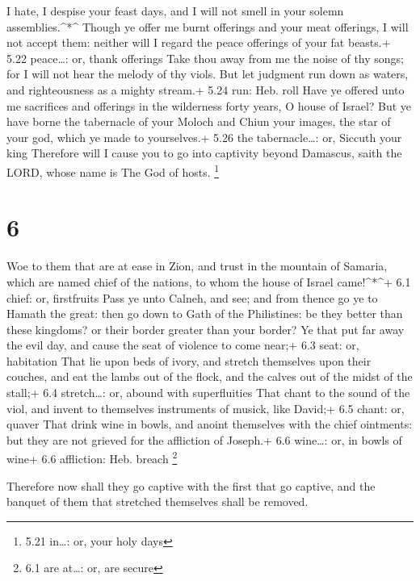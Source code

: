  I hate, I despise your feast days, and I will not smell in
your solemn assemblies.\^{}*\^{}  Though ye offer me burnt
offerings and your meat offerings, I will not accept them: neither will
I regard the peace offerings of your fat beasts.+ 5.22 peace\ldots: or,
thank offerings  Take thou away from me the noise of thy
songs; for I will not hear the melody of thy viols.  But
let judgment run down as waters, and righteousness as a mighty stream.+
5.24 run: Heb. roll  Have ye offered unto me sacrifices and
offerings in the wilderness forty years, O house of Israel?
 But ye have borne the tabernacle of your Moloch and Chiun
your images, the star of your god, which ye made to yourselves.+ 5.26
the tabernacle\ldots: or, Siccuth your king  Therefore will
I cause you to go into captivity beyond Damascus, saith the LORD, whose
name is The God of hosts. \footnote{5.21 in\ldots: or, your holy days}

\hypertarget{section-5}{%
\section{6}\label{section-5}}

 Woe to them that are at ease in Zion, and trust in the
mountain of Samaria, which are named chief of the nations, to whom the
house of Israel came!\^{}*\^{}+ 6.1 chief: or, firstfruits 
Pass ye unto Calneh, and see; and from thence go ye to Hamath the great:
then go down to Gath of the Philistines: be they better than these
kingdoms? or their border greater than your border?  Ye that
put far away the evil day, and cause the seat of violence to come near;+
6.3 seat: or, habitation  That lie upon beds of ivory, and
stretch themselves upon their couches, and eat the lambs out of the
flock, and the calves out of the midst of the stall;+ 6.4 stretch\ldots:
or, abound with superfluities  That chant to the sound of
the viol, and invent to themselves instruments of musick, like David;+
6.5 chant: or, quaver  That drink wine in bowls, and anoint
themselves with the chief ointments: but they are not grieved for the
affliction of Joseph.+ 6.6 wine\ldots: or, in bowls of wine+ 6.6
affliction: Heb. breach \footnote{6.1 are at\ldots: or, are secure}

 Therefore now shall they go captive with the first that go
captive, and the banquet of them that stretched themselves shall be
removed.


